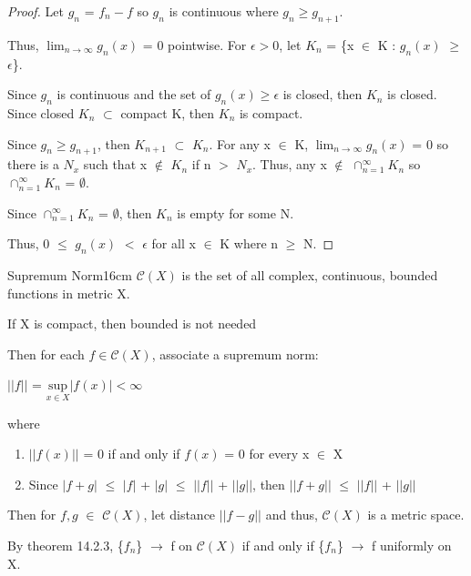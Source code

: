     \begin{proof}
        Let $g_n$ = $f_n - f$ so $g_n$ is continuous where $g_n \geq g_{n+1}$.

        Thus, $\lim_{n \rightarrow \infty} g_n(x)$ = 0 pointwise.
        For $\epsilon > 0$, let $K_n$ = \{x $\in$ K : $g_n(x)$ $\geq$ $\epsilon$\}.

        Since $g_n$ is continuous and the set of $g_n(x) \geq \epsilon$ is closed,
        then $K_n$ is closed. Since closed $K_n$ $\subset$ compact K, then $K_n$
        is compact.

        Since $g_n \geq g_{n+1}$, then $K_{n+1}$ $\subset$ $K_n$.
        For any x $\in$ K, $\lim_{n \rightarrow \infty} g_n(x)$ = 0 so
        there is a $N_x$ such that x $\not \in$ $K_n$ if n $>$ $N_x$.
        Thus, any x $\not \in$ $\cap_{n=1}^{\infty} K_n$ so
        $\cap_{n=1}^{\infty} K_n$ = $\emptyset$.
        
        Since $\cap_{n=1}^{\infty} K_n$ = $\emptyset$, then $K_n$ is empty for some N.

        Thus, 0 $\leq$ $g_n(x)$ $<$ $\epsilon$ for all x $\in$ K where n $\geq$ N.
    \end{proof}

    \vspace{0.5cm}



    \begin{definition}{Supremum Norm}{16cm}
        $\mathscr{C}(X)$ is the set of all
        complex, continuous, bounded functions in metric X.
        
        \hspace{0.5cm}
        If X is compact, then bounded is not needed

        Then for each $f \in \mathscr{C}(X)$, associate
        a {\color{lblue} supremum norm}:

        \hspace{0.5cm}
        $|| f ||$ = $\underset{x \in X}{\text{sup}} |f(x)| < \infty$

        where

        \begin{enumerate}[label=(\alph*), leftmargin=1cm, itemsep=0.1cm]
            \item $|| f(x) ||$ = 0 if and only if $f(x)$ = 0 for every x $\in$ X
            
            \item Since $|f+g|$ $\leq$ $|f|$ + $|g|$ $\leq$ $||f||$ + $||g||$,
            then $||f+g||$ $\leq$ $||f||$ + $||g||$
        \end{enumerate}

        Then for $f,g$ $\in$ $\mathscr{C}(X)$, let distance $||f-g||$
        and thus, $\mathscr{C}(X)$ is a metric space.

        \vspace{0.3cm}

        By {\color{red} theorem 14.2.3},
        \{$f_n$\} $\rightarrow$ f on $\mathscr{C}(X)$ if
        and only if \{$f_n$\} $\rightarrow$ f uniformly on X.
    \end{definition}

